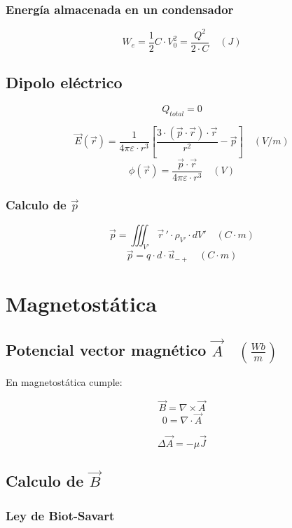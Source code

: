 \documentclass[12pt,a4paper]{article}
\begin{document}
\subsubsection{Energía almacenada en un condensador}
\label{ssub:energia_almacenada_en_un_condensador}

\[ W_e = \frac{1}{2} C \cdot V_0^2 = \frac{Q^2}{2 \cdot C} \quad (J) \]

\subsection{Dipolo eléctrico}
\label{sub:dipolo_electrico}

\[ Q_{total} = 0 \]

\[ \vec{E} ( \vec{r} ) = \frac{1}{4 \pi \varepsilon \cdot r^3} \left[ \frac{3 \cdot ( \vec{p} \cdot \vec{r} ) \cdot \vec{r}}{r^2} - \vec{p} \right] \quad (V/m) \]
\[ \phi ( \vec{r} ) = \frac{ \vec{p} \cdot \vec{r}}{4 \pi \varepsilon \cdot r^3} \quad (V) \] 

\subsubsection{Calculo de $ \vec{p} $ }
\label{ssub:calculo_de_p}

\[ \vec{p} = \iiint_{V'} \vec{r}\,' \cdot \rho_{V'} \cdot dV' \quad (C \cdot m) \]
\[ \vec{p} = q \cdot d \cdot \vec{u}_{-+} \quad (C \cdot m) \]


\section{Magnetostática}
\label{sec:magnetostatica}

\subsection{Potencial vector magnético $ \vec{A} \quad \left( \frac{Wb}{m} \right) $ }
\label{sub:potencial_vector_magnetico}

En magnetostática cumple:

\[ \vec{B} = \nabla \times \vec{A} \]
\[ 0 = \nabla \cdot \vec{A} \]

\[ \Delta \vec{A} = - \mu \vec{J} \]

\subsection{Calculo de $ \vec{B} $ }
\label{sub:calculo_de_b_}

\subsubsection{Ley de Biot-Savart}
\label{ssub:ley_de_biot_savart}
\end{document}
